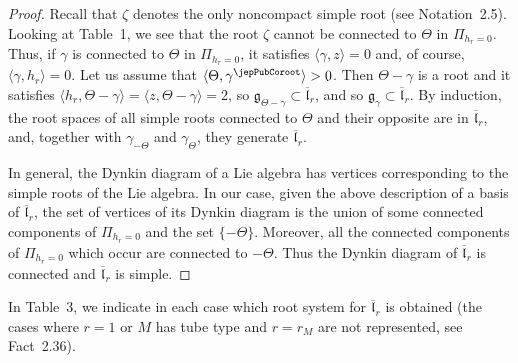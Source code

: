 \begin{proof}
Recall that $\zeta$ denotes the only noncompact simple root (see Notation~2.5). Looking at Table~1, we see that the root $\zeta$ cannot be connected to $\Theta$ in $\Pi_{h_r=0}$. Thus, if $\gamma$ is connected to $\Theta$ in $\Pi_{h_r=0}$, it satisfies $\langle\gamma,z\rangle=0$ and, of course, $\langle\gamma,h_r\rangle=0$. Let us assume that $\langle\Theta,\gamma^\jepPubCoroot\rangle>0$. Then $\Theta-\gamma$ is a root and it satisfies $\langle h_r,\Theta-\gamma\rangle=\langle z,\Theta-\gamma\rangle=2$, so $\mathfrak g_{\Theta-\gamma}\subset\overline{\mathfrak l}_r$, and so $\mathfrak g_\gamma\subset\overline{\mathfrak l}_r$. By induction, the root spaces of all simple roots connected to $\Theta$ and their opposite are in $\overline{\mathfrak l}_r$, and, together with $\gamma_{-\Theta}$ and $\gamma_\Theta$, they generate $\overline{\mathfrak l}_r$.

In general, the Dynkin diagram of a Lie algebra has vertices corresponding to the simple roots of the Lie algebra. In our case, given the above description of a basis of $\overline{\mathfrak l}_r$, the set of vertices of its Dynkin diagram is the union of some connected components of $\Pi_{h_r=0}$ and the set $\{-\Theta\}$. Moreover, all the connected components of $\Pi_{h_r=0}$ which occur are connected to $-\Theta$. Thus the Dynkin diagram of $\overline{\mathfrak l}_r$ is connected and $\overline{\mathfrak l}_r$ is simple.
\end{proof}
In Table~3, we indicate in each case which root system for $\overline{\mathfrak l}_r$ is obtained (the cases where $r=1$ or $M$ has tube type and $r=r_M$ are not represented, see Fact~2.36).
\clearpage

